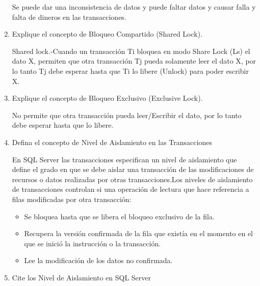 \begin{enumerate}
Se puede dar una inconsistencia de datos y puede faltar datos y causar falla y falta de dineros en las transacciones.

\item Explique el concepto de Bloqueo Compartido (Shared Lock).

Shared lock.-Cuando un transacción Ti bloquea en modo Share Lock (Ls) el dato X, permiten que otra transacción Tj pueda solamente leer el dato X, por lo tanto Tj debe esperar hasta que Ti lo libere (Unlock) para poder escribir X.

\item Explique el concepto de Bloqueo Exclusivo (Exclusive Lock).

No permite que otra transacción pueda leer/Escribir el dato, por lo tanto debe esperar hasta que lo libere.

\item Defina el concepto de Nivel de Aislamiento en las Transacciones

En SQL Server las transacciones especifican un nivel de aislamiento que define el grado en que se debe aislar una transacción de las modificaciones de recursos o datos realizadas por otras transacciones.Los niveles de aislamiento de transacciones controlan si una operación de lectura que hace referencia a filas modificadas por otra transacción:

\begin{itemize}
\item Se bloquea hasta que se libera el bloqueo exclusivo de la fila.
\item Recupera la versión confirmada de la fila que existía en el momento en el que se inició la instrucción o la transacción.
\item Lee la modificación de los datos no confirmada.
\end{itemize}

\item Cite los Nivel de Aislamiento en SQL Server


\end{enumerate}
